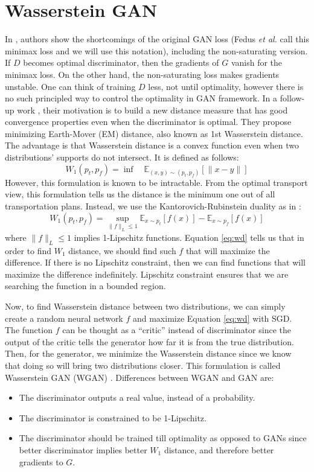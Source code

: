 \documentclass[a4paper,onesided,12pt]{report}
\begin{document}
\section{Wasserstein GAN}
\label{sec:wgan}
In \cite{principledmethods}, authors show the shortcomings of the original GAN loss (Fedus \textit{et al.} \cite{manypaths} call this minimax loss and we will use this notation), including the non-saturating version. If $D$ becomes optimal discriminator, then the gradients of $G$ vanish for the minimax loss. On the other hand, the non-saturating loss makes gradients unstable. One can think of training $D$ less, not until optimality, however there is no such principled way to control the optimality in GAN framework. In a follow-up work \cite{wgan}, their motivation is to build a new distance measure that has good convergence properties even when the discriminator is optimal. They propose minimizing Earth-Mover (EM) distance, also known as 1st Wasserstein distance. The advantage is that Wasserstein distance is a convex function even when two distributions' supports do not intersect. It is defined as follows:
\begin{equation}
W_1(p_t, p_f) = \inf \quad \mathbb{E}_{(x,y) \sim (p_t, p_f)} [ \| x-y \| ]
\label{eq:emd}
\end{equation}
However, this formulation is known to be intractable. From the optimal transport view, this formulation tells us the distance is the minimum one out of all transportation plans. Instead, we use the Kantorovich-Rubinstein duality as in \cite{wgan}:
\begin{equation}
W_1(p_t, p_f) = \underset{\|f\|_L \leq 1}{\sup} \mathbb{E}_{x\sim p_t} [f(x)] - \mathbb{E}_{x \sim p_f} [f(x)]
\label{eq:wd}
\end{equation}
where $\|f\|_L \leq 1$ implies 1-Lipschitz functions. Equation \ref{eq:wd} tells us that in order to find $W_1$ distance, we should find such $f$ that will maximize the difference. If there is no Lipschitz constraint, then we can find functions that will maximize the difference indefinitely. Lipschitz constraint ensures that we are searching the function in a bounded region.

Now, to find Wasserstein distance between two distributions, we can simply create a random neural network $f$ and maximize Equation \ref{eq:wd} with SGD. The function $f$ can be thought as a ``critic'' instead of discriminator since the output of the critic tells the generator how far it is from the true distribution. Then, for the generator, we minimize the Wasserstein distance since we know that doing so will bring two distributions closer. This formulation is called Wasserstein GAN (WGAN) \cite{wgan}.  Differences between WGAN and GAN are:
\begin{itemize}
	\item The discriminator outputs a real value, instead of a probability.
	\item The discriminator is constrained to be 1-Lipschitz.
	\item The discriminator should be trained till optimality as opposed to GANs since better discriminator implies better $W_1$ distance, and therefore better gradients to $G$.
\end{itemize}
\end{document}

